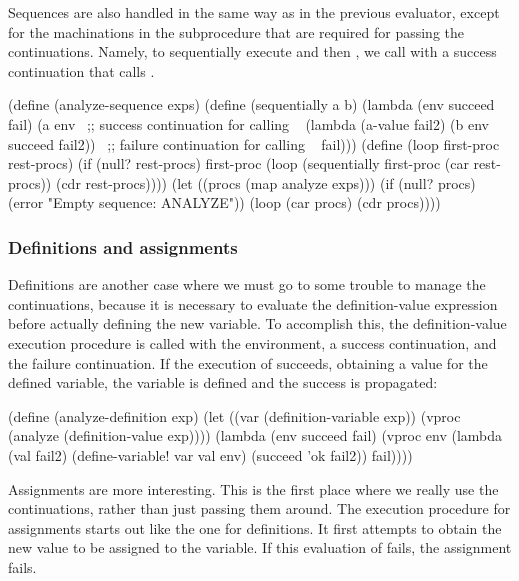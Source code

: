 \noindent
Sequences are also handled in the same way as in the previous evaluator, except
for the machinations in the subprocedure  that are required
for passing the continuations.  Namely, to sequentially execute  and
then , we call  with a success continuation that calls
.

\begin{codeBlock}
(define (analyze-sequence exps)
  (define (sequentially a b)
    (lambda (env succeed fail)
      (a env
         ~\textrm{;; success continuation for calling }~
         (lambda (a-value fail2)
           (b env succeed fail2))
         ~\textrm{;; failure continuation for calling }~
         fail)))
  (define (loop first-proc rest-procs)
    (if (null? rest-procs)
        first-proc
        (loop (sequentially first-proc
                            (car rest-procs))
              (cdr rest-procs))))
  (let ((procs (map analyze exps)))
    (if (null? procs)
        (error "Empty sequence: ANALYZE"))
    (loop (car procs) (cdr procs))))
\end{codeBlock}

\subsubsection*{Definitions and assignments}

Definitions are another case where we must go to some trouble to manage the
continuations, because it is necessary to evaluate the definition-value
expression before actually defining the new variable.  To accomplish this, the
definition-value execution procedure  is called with the
environment, a success continuation, and the failure continuation.  If the
execution of  succeeds, obtaining a value  for the
defined variable, the variable is defined and the success is propagated:

\begin{codeBlock}
(define (analyze-definition exp)
  (let ((var (definition-variable exp))
        (vproc (analyze (definition-value exp))))
    (lambda (env succeed fail)
      (vproc env
             (lambda (val fail2)
               (define-variable! var val env)
               (succeed 'ok fail2))
             fail))))
\end{codeBlock}

\noindent
Assignments are more interesting.  This is the first place where we really use
the continuations, rather than just passing them around.  The execution
procedure for assignments starts out like the one for definitions.  It first
attempts to obtain the new value to be assigned to the variable. If this
evaluation of  fails, the assignment fails.

